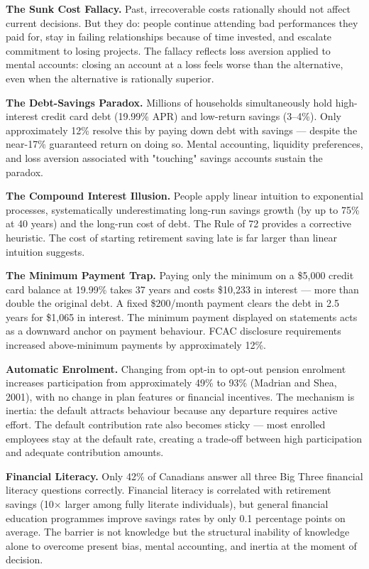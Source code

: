 \documentclass[12pt, letterpaper]{article}
\begin{document}
\textbf{The Sunk Cost Fallacy.} Past, irrecoverable costs rationally should not affect current decisions. But they do: people continue attending bad performances they paid for, stay in failing relationships because of time invested, and escalate commitment to losing projects. The fallacy reflects loss aversion applied to mental accounts: closing an account at a loss feels worse than the alternative, even when the alternative is rationally superior.

\textbf{The Debt-Savings Paradox.} Millions of households simultaneously hold high-interest credit card debt (19.99\% APR) and low-return savings (3--4\%). Only approximately 12\% resolve this by paying down debt with savings --- despite the near-17\% guaranteed return on doing so. Mental accounting, liquidity preferences, and loss aversion associated with "touching" savings accounts sustain the paradox.

\textbf{The Compound Interest Illusion.} People apply linear intuition to exponential processes, systematically underestimating long-run savings growth (by up to 75\% at 40 years) and the long-run cost of debt. The Rule of 72 provides a corrective heuristic. The cost of starting retirement saving late is far larger than linear intuition suggests.

\textbf{The Minimum Payment Trap.} Paying only the minimum on a \$5,000 credit card balance at 19.99\% takes 37 years and costs \$10,233 in interest --- more than double the original debt. A fixed \$200/month payment clears the debt in 2.5 years for \$1,065 in interest. The minimum payment displayed on statements acts as a downward anchor on payment behaviour. FCAC disclosure requirements increased above-minimum payments by approximately 12\%.

\textbf{Automatic Enrolment.} Changing from opt-in to opt-out pension enrolment increases participation from approximately 49\% to 93\% (Madrian and Shea, 2001), with no change in plan features or financial incentives. The mechanism is inertia: the default attracts behaviour because any departure requires active effort. The default contribution rate also becomes sticky --- most enrolled employees stay at the default rate, creating a trade-off between high participation and adequate contribution amounts.

\textbf{Financial Literacy.} Only 42\% of Canadians answer all three Big Three financial literacy questions correctly. Financial literacy is correlated with retirement savings (10$\times$ larger among fully literate individuals), but general financial education programmes improve savings rates by only 0.1 percentage points on average. The barrier is not knowledge but the structural inability of knowledge alone to overcome present bias, mental accounting, and inertia at the moment of decision.
\end{document}
